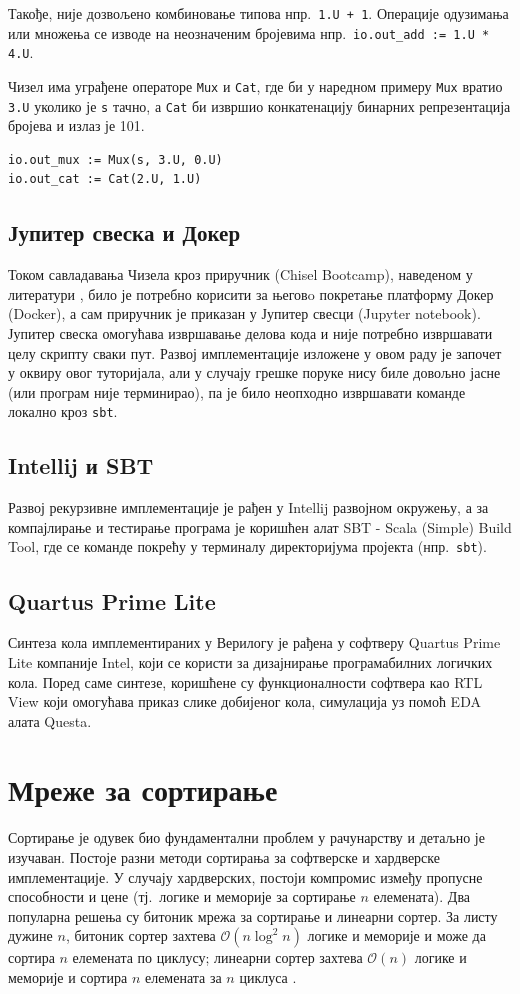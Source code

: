 \documentclass[12pt, a4paper]{article}
\theoremstyle{definition}
\begin{document}
Такође, није дозвољено комбиновање типова нпр.\ \verb-1.U + 1-. Операције одузимања или множења се изводе на неозначеним бројевима нпр.\ \verb+io.out_add := 1.U * 4.U+.

Чизел има уграђене операторе \verb+Mux+ и \verb+Cat+, где би у наредном примеру \verb+Mux+ вратио \verb+3.U+ уколико је \verb+s+ тачно, а \verb+Cat+ би извршио конкатенацију бинарних репрезентација бројева и излаз је 101.
\begin{verbatim}
io.out_mux := Mux(s, 3.U, 0.U)
io.out_cat := Cat(2.U, 1.U)
\end{verbatim}


\subsection{Јупитер свеска и Докер}
Током савладавања Чизела кроз приручник (Chisel Bootcamp), наведеном у литератури \cite{git_chisel}, било је потребно корисити за његовo покретање платформу Докер (Docker), а сам приручник је приказан у Јупитер свесци (Jupyter notebook). Јупитер свеска омогућава извршавање делова кода и није потребно извршавати целу скрипту сваки пут. Развој имплементације изложене у овом раду је започет у оквиру овог туторијала, али у случају грешке поруке нису биле довољно јасне (или програм није терминирао), па је било неопходно извршавати команде локално кроз \verb+sbt+.

\subsection{Intellij и SBT}
Развој рекурзивне имплементације је рађен у Intellij развојном окружењу, а за компајлирање и тестирање програма је коришћен алат SBT - Scala (Simple) Build Tool, где се команде покрећу у терминалу директоријума пројекта (нпр.\ \verb+sbt+).

\subsection{Quartus Prime Lite}
Синтеза кола имплементираних у Верилогу је рађена у софтверу Quartus Prime Lite компаније Intel, који се користи за дизајнирање програмабилних логичких кола. Поред саме синтезе, коришћене су функционалности софтвера као RTL View који омогућава приказ слике добијеног кола, симулација уз помоћ EDA алата Questa.

\newpage
\section{Мреже за сортирање}
Сортирање је одувек био фундаментални проблем у рачунарству и детаљно је изучаван. Постоје разни методи сортирања за софтверске и хардверске имплементације. У случају хардверских, постоји компромис између пропусне способности и цене (тј.\ логике и меморије за сортирање $n$ елемената). Два популарна решења су битоник мрежа за сортирање и линеарни сортер. За листу дужине $n$, битоник сортер захтева $\mathcal{O}(n \log^2 n)$ логике и меморије и може да сортира $n$ елемената по циклусу; линеарни сортер захтева $\mathcal{O}(n)$ логике и меморије и сортира $n$ елемената за $n$ циклуса \cite{zuluaga2016}.
\end{document}
